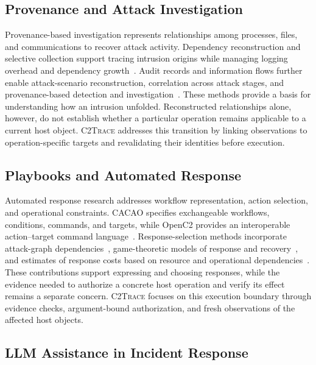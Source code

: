 \documentclass[pdflatex,sn-basic]{sn-jnl}
\newcommand{\system}{\textsc{C2Trace}\xspace}
\begin{document}
\subsection{Provenance and Attack Investigation}

Provenance-based investigation represents relationships among processes, files, and communications to recover attack activity. Dependency reconstruction and selective collection support tracing intrusion origins while managing logging overhead and dependency growth~\citep{backtracker2003,protracer2016}. Audit records and information flows further enable attack-scenario reconstruction, correlation across attack stages, and provenance-based detection and investigation~\citep{sleuth2017,holmes2019,kairos2024}. These methods provide a basis for understanding how an intrusion unfolded. Reconstructed relationships alone, however, do not establish whether a particular operation remains applicable to a current host object. \system addresses this transition by linking observations to operation-specific targets and revalidating their identities before execution.

\subsection{Playbooks and Automated Response}

Automated response research addresses workflow representation, action selection, and operational constraints. CACAO specifies exchangeable workflows, conditions, commands, and targets, while OpenC2 provides an interoperable action--target command language~\citep{cacao2023,openc2-2019}. Response-selection methods incorporate attack-graph dependencies~\citep{adepts2005}, game-theoretic models of response and recovery~\citep{rre2014}, and estimates of response costs based on resource and operational dependencies~\citep{orcef2015}. These contributions support expressing and choosing responses, while the evidence needed to authorize a concrete host operation and verify its effect remains a separate concern. \system focuses on this execution boundary through evidence checks, argument-bound authorization, and fresh observations of the affected host objects.

\subsection{LLM Assistance in Incident Response}
\end{document}

